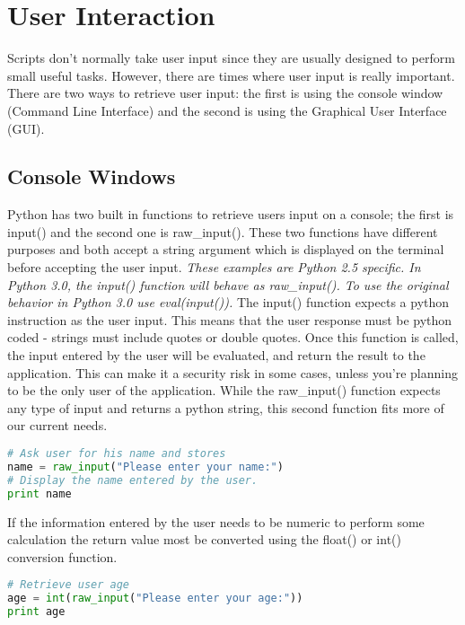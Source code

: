 \section{User Interaction}
Scripts don't normally take user input since they are usually designed to
perform small useful tasks. However, there are times where user input is really
important. There are two ways to retrieve user input: the first is using the
console window (Command Line Interface) and the second is using the Graphical
User Interface (GUI).

\subsection{Console Windows}

Python has two built in functions to retrieve users input on a console; the
first is input() and the second one is raw\_input(). These two functions have
different purposes and both accept a string argument which is displayed on the
terminal before accepting the user input.
\textit{These examples are Python 2.5 specific. In Python 3.0, the input()
function will behave as raw\_input(). To use the original behavior in Python 3.0
use eval(input()).}
The input() function expects a python instruction as the user input. This means
that the user response must be python coded - strings must include quotes or
double quotes. Once this function is called, the input entered by the user will
be evaluated, and return the result to the application. This can make it a
security risk in some cases, unless you're planning to be the only user of the
application.  While the raw\_input() function expects any type of input and
returns a python string, this second function fits more of our current needs.
\lstset{basicstyle=\scriptsize, numbers=left, captionpos=b, tabsize=4}
\begin{lstlisting}[caption=raw\_input example,language={Python},
xleftmargin=15pt, label=lst:rawinputexample]
# Ask user for his name and stores
name = raw_input("Please enter your name:")
# Display the name entered by the user.
print name
\end{lstlisting}

If the information entered by the user needs to be numeric to perform some
calculation the return value most be converted using the float() or int()
conversion function.
\lstset{basicstyle=\scriptsize, numbers=left, captionpos=b, tabsize=4}
\begin{lstlisting}[caption=Get Age,language={Python},
xleftmargin=15pt, label=lst:getage]
# Retrieve user age
age = int(raw_input("Please enter your age:"))
print age
\end{lstlisting}

